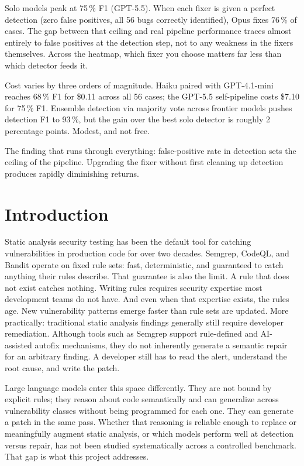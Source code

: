 \documentclass[12pt]{article}
\begin{document}
Solo models peak at 75\,\% F1 (GPT-5.5). When each fixer is given a perfect
detection (zero false positives, all 56 bugs correctly identified), Opus fixes
76\,\% of cases. The gap between that ceiling and real pipeline performance
traces almost entirely to false positives at the detection step, not to any
weakness in the fixers themselves. Across the heatmap, which fixer you choose
matters far less than which detector feeds it.

Cost varies by three orders of magnitude. Haiku paired with GPT-4.1-mini
reaches 68\,\% F1 for \$0.11 across all 56 cases; the GPT-5.5 self-pipeline
costs \$7.10 for 75\,\% F1. Ensemble detection via majority vote across
frontier models pushes detection F1 to 93\,\%, but the gain over the best solo
detector is roughly 2 percentage points. Modest, and not free.

The finding that runs through everything: false-positive rate in detection sets
the ceiling of the pipeline. Upgrading the fixer without first cleaning up
detection produces rapidly diminishing returns.

\newpage
\tableofcontents

\newpage
\section{Introduction}

Static analysis security testing has been the default tool for catching
vulnerabilities in production code for over two decades. Semgrep, CodeQL, and
Bandit operate on fixed rule sets: fast, deterministic, and guaranteed to catch
anything their rules describe. That guarantee is also the limit. A rule that
does not exist catches nothing. Writing rules requires security expertise most
development teams do not have. And even when that expertise exists, the rules
age. New vulnerability patterns emerge faster than rule sets are updated. More practically: traditional static analysis findings generally still require
developer remediation. Although tools such as Semgrep support rule-defined and
AI-assisted autofix mechanisms, they do not inherently generate a semantic
repair for an arbitrary finding. A developer still has to read the alert,
understand the root cause, and write the patch.

Large language models enter this space differently. They are not bound by
explicit rules; they reason about code semantically and can generalize across
vulnerability classes without being programmed for each one. They can generate
a patch in the same pass. Whether that reasoning is reliable enough to
replace or meaningfully augment static analysis, or which models perform well
at detection versus repair, has not been studied systematically across a
controlled benchmark. That gap is what this project addresses.
\end{document}
